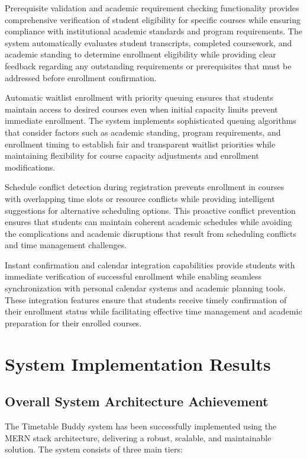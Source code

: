 Prerequisite validation and academic requirement checking functionality provides comprehensive verification of student eligibility for specific courses while ensuring compliance with institutional academic standards and program requirements. The system automatically evaluates student transcripts, completed coursework, and academic standing to determine enrollment eligibility while providing clear feedback regarding any outstanding requirements or prerequisites that must be addressed before enrollment confirmation.

Automatic waitlist enrollment with priority queuing ensures that students maintain access to desired courses even when initial capacity limits prevent immediate enrollment. The system implements sophisticated queuing algorithms that consider factors such as academic standing, program requirements, and enrollment timing to establish fair and transparent waitlist priorities while maintaining flexibility for course capacity adjustments and enrollment modifications.

Schedule conflict detection during registration prevents enrollment in courses with overlapping time slots or resource conflicts while providing intelligent suggestions for alternative scheduling options. This proactive conflict prevention ensures that students can maintain coherent academic schedules while avoiding the complications and academic disruptions that result from scheduling conflicts and time management challenges.

Instant confirmation and calendar integration capabilities provide students with immediate verification of successful enrollment while enabling seamless synchronization with personal calendar systems and academic planning tools. These integration features ensure that students receive timely confirmation of their enrollment status while facilitating effective time management and academic preparation for their enrolled courses.

\section{System Implementation Results}

\subsection{Overall System Architecture Achievement}

The Timetable Buddy system has been successfully implemented using the MERN stack architecture, delivering a robust, scalable, and maintainable solution. The system consists of three main tiers:

